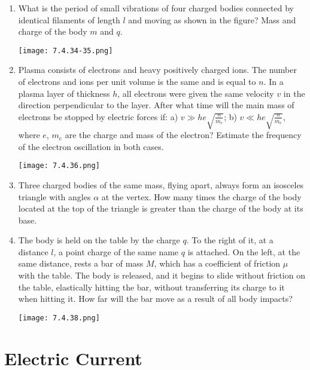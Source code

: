\documentclass{article}
\begin{document}
\begin{enumerate}[label=7.4.\arabic*]
\item What is the period of small vibrations of four charged bodies connected by identical filaments of length $l$ and moving as shown in the figure? Mass and charge of the body $m$ and $q$.

\begin{center}
    \texttt{[image: 7.4.34-35.png]}
\end{center}


\item Plasma consists of electrons and heavy positively charged ions. The number of electrons and ions per unit volume is the same and is equal to $n$. In a plasma layer of thickness $h$, all electrons were given the same velocity $v$ in the direction perpendicular to the layer. After what time will the main mass of electrons be stopped by electric forces if: a) $v \gg he\sqrt{\frac{n}{m_e}}$; b) $v \ll he\sqrt{\frac{n}{m_e}}$, where $e$, $m_e$ are the charge and mass of the electron? Estimate the frequency of the electron oscillation in both cases.

\begin{center}
    \texttt{[image: 7.4.36.png]}
\end{center}


\item Three charged bodies of the same mass, flying apart, always form an isosceles triangle with angles $\alpha$ at the vertex. How many times the charge of the body located at the top of the triangle is greater than the charge of the body at its base.

\item The body is held on the table by the charge $q$. To the right of it, at a distance $l$, a point charge of the same name $q$ is attached. On the left, at the same distance, rests a bar of mass $M$, which has a coefficient of friction $\mu$ with the table. The body is released, and it begins to slide without friction on the table, elastically hitting the bar, without transferring its charge to it when hitting it. How far will the bar move as a result of all body impacts?

\begin{center}
    \texttt{[image: 7.4.38.png]}
\end{center}



\end{enumerate}

\section{Electric Current}
\end{document}
